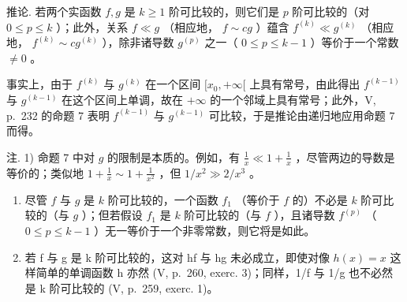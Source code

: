 推论. 若两个实函数 \(f, g\) 是 \(k \geqslant 1\) 阶可比较的，则它们是 \(p\) 阶可比较的（对 \(0 \leqslant p \leqslant k\) ）；此外，关系 \(f \ll g\) （相应地， \(f \sim cg\) ）蕴含 \(f^{(k)} \ll g^{(k)}\) （相应地， \(f^{(k)} \sim cg^{(k)}\) ），除非诸导数 \(g^{(p)}\) 之一（ \(0 \leqslant p \leqslant k - 1\) ）等价于一个常数 \(\neq 0\) 。

事实上，由于 \(f^{(k)}\) 与 \(g^{(k)}\) 在一个区间 \([x_0, +\infty[\) 上具有常号，由此得出 \(f^{(k-1)}\) 与 \(g^{(k-1)}\) 在这个区间上单调，故在 \(+\infty\) 的一个邻域上具有常号；此外，V, p.~232 的命题 7 表明 \(f^{(k-1)}\) 与 \(g^{(k-1)}\) 可比较，于是推论由递归地应用命题 7 而得。

注. 1) 命题 7 中对 \(g\) 的限制是本质的。例如，有 \(\frac{1}{x} \ll 1 + \frac{1}{x}\) ，尽管两边的导数是等价的；类似地 \(1 + \frac{1}{x} \sim 1 + \frac{1}{x^2}\) ，但 \(1 / x^2 \gg 2 / x^3\) 。

\begin{enumerate}
\def\labelenumi{\arabic{enumi})}
\setcounter{enumi}{1}
\item
  尽管 \(f\) 与 \(g\) 是 \(k\) 阶可比较的，一个函数 \(f_{1}\) （等价于 \(f\) 的）不必是 \(k\) 阶可比较的（与 \(g\) ）；但若假设 \(f_{1}\) 是 \(k\) 阶可比较的（与 \(f\) ），且诸导数 \(f^{(p)}\) （ \(0 \leqslant p \leqslant k - 1\) ）无一等价于一个非零常数，则它将是如此。
\item
  若 f 与 g 是 k 阶可比较的，这对 hf 与 hg 未必成立，即使对像 \(h(x) = x\) 这样简单的单调函数 h 亦然 (V, p.~260, exerc. 3)；同样，1/f 与 1/g 也不必然是 k 阶可比较的 (V, p.~259, exerc. 1)。
\end{enumerate}

